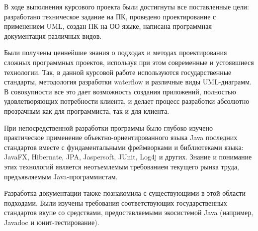 
В ходе выполнения курсового проекта были достигнуты все поставленные цели:
разработано техническое задание на ПК, проведено проектирование с применением
UML, создан ПК на ОО языке, написана программная документация различных видов.

Были получены ценнейшие знания о подходах и методах проектирования сложных
программных проектов, используя при этом современные и устоявшиеся технологии.
Так, в данной курсовой работе используются государственные стандарты,
методология разработки waterflow и различные виды UML-диаграмм. В совокупности
все это дает возможность создания приложений, полностью удовлетворяющих
потребности клиента, и делает процесс разработки абсолютно прозрачным как для
программиста, так и для клиента.

При непосредственной разработки программы было глубоко изучено практическое
применение объектно-ориентированного языка Java последних стандартов вместе с
фундаментальными фреймворками и библиотеками языка: JavaFX, Hibernate, JPA,
Jaspersoft, JUnit, Log4j и других. Знание и понимание этих технологий является
неотъемлемым требованием текущего рынка труда, предъявляемым Java-программистам.

Разработка документации также познакомила с существующими в этой области подходами.
Были изучены требования соответствующих государственных стандартов вкупе со
средствами, предоставляемыми экосистемой Java (например, Javadoc и
юнит-тестирование).


\clearpage

